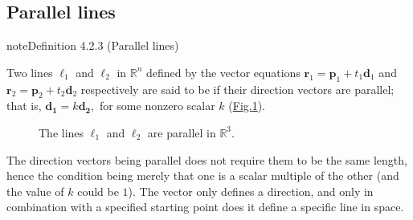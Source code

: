\documentclass[letterpaper,10pt,english]{jupyterBook}
\let\sphinxpxdimen\pdfpxdimen\else\newdimen\sphinxpxdimen
\begin{document}
\subsection{Parallel lines}
\label{\detokenize{_pages/4.1_Lines:parallel-lines}}\label{\detokenize{_pages/4.1_Lines:index-3}}\label{_pages/4.1_Lines:parallel-lines-definition}
\begin{sphinxadmonition}{note}{Definition 4.2.3 (Parallel lines)}



\sphinxAtStartPar
Two lines \(\ell_1\) and \(\ell_2\) in \(\mathbb{R}^n\) defined by the vector equations \(\mathbf{r}_1 = \mathbf{p}_1 + t_1 \mathbf{d}_1\) and \(\mathbf{r}_2 = \mathbf{p}_2 + t_2 \mathbf{d}_2\) respectively are said to be  if their direction vectors are parallel; that is, \(\mathbf{d_1} = k\mathbf{d_2},\) for some non\sphinxhyphen{}zero scalar \(k\) (\hyperref[\detokenize{_pages/4.1_Lines:parallel-lines-figure}]{Fig.\@ \ref{\detokenize{_pages/4.1_Lines:parallel-lines-figure}}}).

\begin{figure}[htbp]
\centering
\capstart

\noindent\sphinxincludegraphics[width=500\sphinxpxdimen]{{4_parallel_lines}.svg}
\caption{The lines \(\ell_1\) and \(\ell_2\) are parallel in \(\mathbb{R}^3\).}\label{\detokenize{_pages/4.1_Lines:parallel-lines-figure}}\end{figure}
\end{sphinxadmonition}

\sphinxAtStartPar
The direction vectors being parallel does not require them to be the same length, hence the condition being merely that one is a scalar multiple of the other (and the value of \(k\) could be \(1\)). The vector only defines a direction, and only in combination with a specified starting point does it define a specific line in space.
\end{document}

